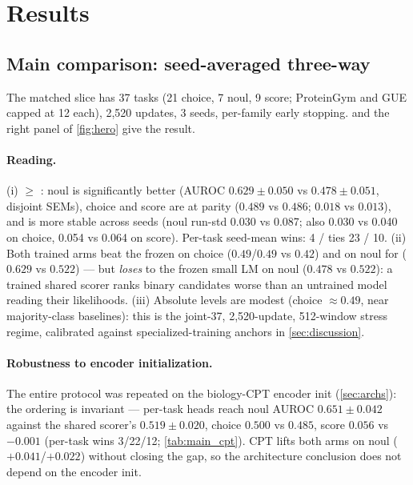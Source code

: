 \section{Results}
\label{sec:results}

\subsection{Main comparison: seed-averaged three-way}
\label{sec:mainresults}

The matched slice has 37 tasks (21 choice, 7 noul, 9 score; ProteinGym and GUE capped at
12 each), 2{,}520 updates, 3 seeds, per-family early stopping.  and the
right panel of \cref{fig:hero} give the result.



\paragraph{Reading.} (i)  $\ge$ : noul is significantly better (AUROC
$0.629\pm0.050$ vs $0.478\pm0.051$, disjoint SEMs), choice and score are at parity
($0.489$ vs $0.486$; $0.018$ vs $0.013$), and  is more stable across seeds (noul
run-std 0.030 vs 0.087; also 0.030 vs 0.040 on choice, 0.054 vs 0.064 on score). Per-task
seed-mean wins:  4 / ties 23 /  10. (ii) Both trained arms beat the frozen
 on choice ($0.49$/$0.49$ vs $0.42$) and on noul for  ($0.629$ vs $0.522$)
--- but  \emph{loses} to the frozen small LM on noul ($0.478$ vs $0.522$): a trained
shared scorer ranks binary candidates worse than an untrained model reading their
likelihoods. (iii) Absolute levels are modest (choice ${\approx}0.49$, near majority-class
baselines): this is the joint-37, 2{,}520-update, 512-window stress regime, calibrated
against specialized-training anchors in \cref{sec:discussion}.

\paragraph{Robustness to encoder initialization.}
The entire protocol was repeated on the biology-CPT encoder init (\cref{sec:archs}): the
ordering is invariant --- per-task heads reach noul AUROC $0.651\pm0.042$ against the
shared scorer's $0.519\pm0.020$, choice $0.500$ vs $0.485$, score $0.056$ vs $-0.001$
(per-task wins 3/22/12; \cref{tab:main_cpt}). CPT lifts both arms on noul
($+0.041$/$+0.022$) without closing the gap, so the architecture conclusion does not depend
on the encoder init.


